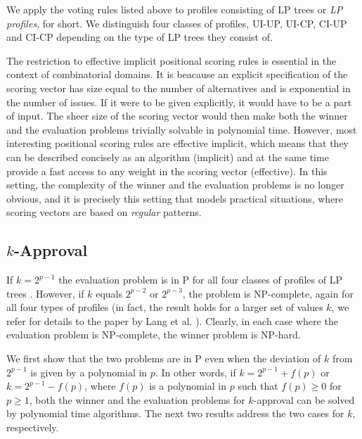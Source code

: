 We apply the voting rules listed above to profiles consisting of LP trees or
\emph{LP profiles}, for short. We distinguish four classes of profiles,
UI-UP, UI-CP, CI-UP and CI-CP depending on the type of LP trees they
consist of. 

\begin{remark}
The restriction to effective implicit positional scoring rules is 
essential in the context of combinatorial domains. It is beacause an 
explicit specification of the scoring vector has size equal to the 
number of alternatives and is exponential in the number of issues. If 
it were to be given explicitly, it would have to be a part of input. 
The sheer size of the scoring vector would then make both the winner 
and the evaluation problems trivially solvable in polynomial time. 
However, most interesting positional scoring rules are effective 
implicit, which means that they can be described concisely as an 
algorithm (implicit) and at the same time provide a fast access to 
any weight in the scoring vector (effective). In this setting, the 
complexity of the winner and the evaluation problems is no longer 
obvious, and it is precisely this setting that models practical
situations, where scoring vectors are based on \emph{regular}
patterns.
\end{remark}


\subsection{$k$-Approval}
If $k=2^{p-1}$ the evaluation problem is in P for all four classes of 
profiles of LP trees \cite{lang:aggLP}. However, if $k$ equals $2^{p-2}$
or $2^{p-3}$, the problem is NP-complete, again for all four types of 
profiles \cite{lang:aggLP} (in fact, the result holds for a larger set 
of values $k$, we refer for details to the paper by Lang et al. 
\cite{lang:aggLP}). Clearly, in each case where the evaluation problem 
is NP-complete, the winner problem is NP-hard.

We first show that the two problems are in P even when the deviation of
$k$ from $2^{p-1}$ is given by a polynomial in $p$. In other words, 
if $k=2^{p-1} + f(p)$ or $k=2^{p-1} - f(p)$, where $f(p)$ is a polynomial 
in $p$ such that $f(p)\geq 0$ for $p\geq 1$, both the winner and the 
evaluation problems for $k$-approval can be solved by polynomial time 
algorithms. The next two results address the two cases for $k$,
respectively.

